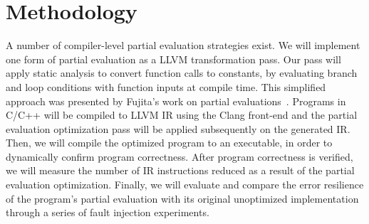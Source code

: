 \section{Methodology}

A number of compiler-level partial evaluation strategies exist.
We will implement one form of partial evaluation as a LLVM transformation pass.
Our pass will apply static analysis to convert function calls to constants, by evaluating branch and loop conditions with function inputs at compile time.
This simplified approach was presented by Fujita’s work on partial evaluations~\cite{Fujita}.
Programs in C/C++ will be compiled to LLVM IR using the Clang front-end and the partial evaluation optimization pass will be applied subsequently on the generated IR.
Then, we will compile the optimized program to an executable, in order to dynamically confirm program correctness.
After program correctness is verified, we will measure the number of IR instructions reduced as a result of the partial evaluation optimization.
Finally, we will evaluate and compare the error resilience of the program’s partial evaluation with its original unoptimized implementation through a series of fault injection experiments.
